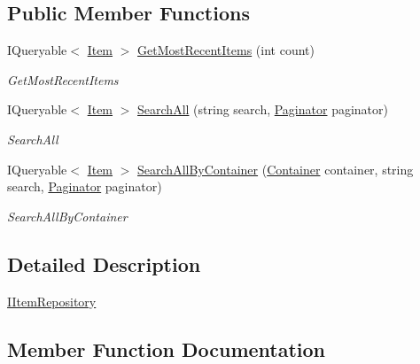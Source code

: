 \subsection*{Public Member Functions}
\begin{DoxyCompactItemize}
\item 
I\+Queryable$<$ \mbox{\hyperlink{class_gtd_app_1_1_data_1_1_item}{Item}} $>$ \mbox{\hyperlink{interface_gtd_app_1_1_repository_1_1_interfaces_1_1_i_item_repository_a1dcdb14bc8a3355bdd81fd2d7837e051}{Get\+Most\+Recent\+Items}} (int count)
\begin{DoxyCompactList}\small\item\em Get\+Most\+Recent\+Items \end{DoxyCompactList}\item 
I\+Queryable$<$ \mbox{\hyperlink{class_gtd_app_1_1_data_1_1_item}{Item}} $>$ \mbox{\hyperlink{interface_gtd_app_1_1_repository_1_1_interfaces_1_1_i_item_repository_aaedb0ab68d51291cacb4a3c292bd3731}{Search\+All}} (string search, \mbox{\hyperlink{class_gtd_app_1_1_repository_1_1_paginator}{Paginator}} paginator)
\begin{DoxyCompactList}\small\item\em Search\+All \end{DoxyCompactList}\item 
I\+Queryable$<$ \mbox{\hyperlink{class_gtd_app_1_1_data_1_1_item}{Item}} $>$ \mbox{\hyperlink{interface_gtd_app_1_1_repository_1_1_interfaces_1_1_i_item_repository_a15919819f2e94457473cc47f73cc6bcd}{Search\+All\+By\+Container}} (\mbox{\hyperlink{class_gtd_app_1_1_data_1_1_container}{Container}} container, string search, \mbox{\hyperlink{class_gtd_app_1_1_repository_1_1_paginator}{Paginator}} paginator)
\begin{DoxyCompactList}\small\item\em Search\+All\+By\+Container \end{DoxyCompactList}\end{DoxyCompactItemize}


\subsection{Detailed Description}
\mbox{\hyperlink{interface_gtd_app_1_1_repository_1_1_interfaces_1_1_i_item_repository}{I\+Item\+Repository}} 



\subsection{Member Function Documentation}
\mbox{\label{interface_gtd_app_1_1_repository_1_1_interfaces_1_1_i_item_repository_a1dcdb14bc8a3355bdd81fd2d7837e051}} 
